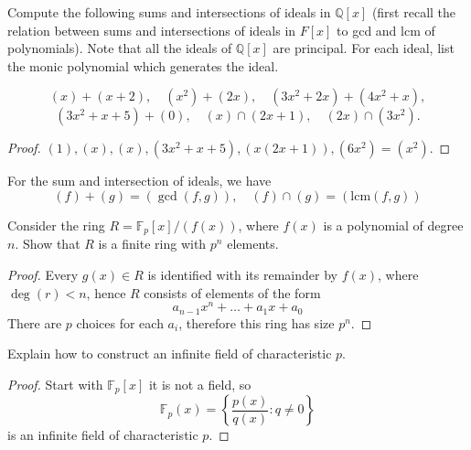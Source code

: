 \documentclass[openany]{book}
\newcommand{\F}{\mathbb{F}}
\begin{document}
\begin{prob}
    Compute the following sums and intersections of ideals in \(\mathbb{Q}[x]\) (first recall the relation between sums and intersections of ideals in \(F[x]\) to gcd and lcm of polynomials). Note that all the ideals of \(\mathbb{Q}[x]\) are principal. For each ideal, list the monic polynomial which generates the ideal.

    \[
    (x) + (x + 2), \quad (x^2) + (2x), \quad (3x^2 + 2x) + (4x^2 + x),
    \]
    \[
    (3x^2 + x + 5) + (0), \quad (x) \cap (2x + 1), \quad (2x) \cap (3x^2).
    \]
\end{prob}
\begin{proof}
    $(1), (x), (x), (3x^2+x+5), (x(2x+1)), (6x^2)=(x^2)$.
\end{proof}
\begin{prop}
    For the sum and intersection of ideals, we have
    \begin{equation*}
        (f)+(g)=(\gcd(f,g)), \quad (f)\cap (g)=(\text{lcm}(f,g))
    \end{equation*}
\end{prop}

\begin{prob}
    Consider the ring \( R = \mathbb{F}_p[x]/(f(x)) \), where \( f(x) \) is a polynomial of degree \( n \). Show that \( R \) is a finite ring with \( p^n \) elements.
\end{prob}
\begin{proof}
    Every $g(x)\in R$ is identified with its remainder by $f(x)$, where $\deg(r)<n$, hence $R$ consists of elements of the form 
    \begin{equation*}
        a_{n-1}x^n+\dots+a_1x+a_0
    \end{equation*}
    There are $p$ choices for each $a_i$, therefore this ring has size $p^n$.
\end{proof}



\begin{prob}
    Explain how to construct an infinite field of characteristic \( p \).
\end{prob}
\begin{proof}
    Start with $\F_p[x]$ it is not a field, so 
    \begin{equation*}
        \F_p(x)=\left\{\frac{p(x)}{q(x)}: q\neq 0\right\}
    \end{equation*}
    is an infinite field of characteristic $p$.
\end{proof}
\end{document}
